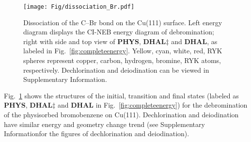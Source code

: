 \documentclass[%
 reprint,
 amsmath,amssymb,
 aps,
prb,
floatfix,
]{revtex4-2}
\newcommand{\lock}{\color{red}}
\newcommand{\lock}{\color{black}}
\newcommand{\sinfo}{Supplementary Information}
\begin{document}
\begin{figure}[hbt]
\centering
\texttt{[image: Fig/dissociation\_Br.pdf]}
\caption{Dissociation of the C--Br bond on the Cu(111) surface. Left energy diagram displays the CI-NEB energy diagram of debromination; right with side and top view of \textbf{PHYS}, \textbf{DHAL$\ddagger$} and \textbf{DHAL}, as labeled in Fig.~\ref{fig:completeenergy}. Yellow, cyan, white, red, RYK spheres represent copper, carbon, hydrogen, bromine, RYK atoms, respectively. Dechlorination and deiodination can be viewed in \sinfo.
}
\label{fig:dissociation_Br}
\end{figure}

{\lock

Fig.~\ref{fig:dissociation_Br} shows the structures of the initial, transition and final states (labeled as \textbf{PHYS}, \textbf{DHAL$\ddagger$} and \textbf{DHAL} in Fig.~\ref{fig:completeenergy}) for the debromination of the physisorbed bromobenzene on Cu(111). Dechlorination and deiodination have similar energy and geometry change trend (see \sinfo for the figures of dechlorination and deiodination).

}
\end{document}
